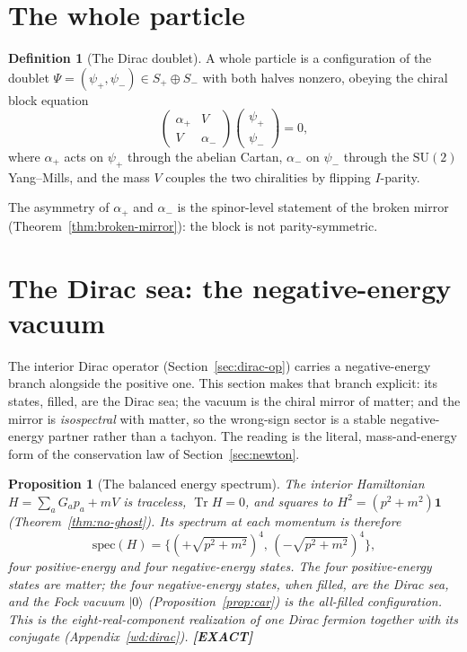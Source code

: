 \documentclass[11pt,oneside]{book}
\newcommand{\Tr}{\operatorname{Tr}}
\newcommand{\status}[1]{{\sffamily\bfseries\color{statuscol}[#1]}}
\theoremstyle{plain}
\newtheorem{proposition}[theorem]{Proposition}
\theoremstyle{definition}
\newtheorem{definition}[theorem]{Definition}
\theoremstyle{remark}
\begin{document}
\section{The whole particle}
\label{sec:whole-particle}

\begin{definition}[The Dirac doublet]
\label{def:whole}
A whole particle is a configuration of the doublet $\Psi=(\psi_+,\psi_-)\in
S_+\oplus S_-$ with both halves nonzero, obeying the chiral block equation
\[
  \begin{pmatrix}\alpha_+ & V\\ V & \alpha_-\end{pmatrix}
  \begin{pmatrix}\psi_+\\ \psi_-\end{pmatrix}=0,
\]
where $\alpha_+$ acts on $\psi_+$ through the abelian Cartan, $\alpha_-$ on $\psi_-$
through the $\mathrm{SU}(2)$ Yang--Mills, and the mass $V$ couples the two
chiralities by flipping $I$-parity.
\end{definition}

The asymmetry of $\alpha_+$ and $\alpha_-$ is the spinor-level statement of the
broken mirror (Theorem~\ref{thm:broken-mirror}): the block is not parity-symmetric.

\section{The Dirac sea: the negative-energy vacuum}
\label{sec:dirac-sea}

The interior Dirac operator (Section~\ref{sec:dirac-op}) carries a negative-energy
branch alongside the positive one. This section makes that branch explicit: its
states, filled, are the Dirac sea; the vacuum is the chiral mirror of matter; and the
mirror is \emph{isospectral} with matter, so the wrong-sign sector is a stable
negative-energy partner rather than a tachyon. The reading is the literal,
mass-and-energy form of the conservation law of Section~\ref{sec:newton}.

\begin{proposition}[The balanced energy spectrum]
\label{prop:sea-spectrum}
The interior Hamiltonian $H=\sum_a G_a p_a+mV$ is traceless, $\Tr H=0$, and squares to
$H^2=(p^2+m^2)\mathbf 1$ (Theorem~\ref{thm:no-ghost}). Its spectrum at each momentum is
therefore
\[
  \mathrm{spec}(H)=\bigl\{(+\sqrt{p^2+m^2})^{4},\,(-\sqrt{p^2+m^2})^{4}\bigr\},
\]
four positive-energy and four negative-energy states. The four positive-energy states
are matter; the four negative-energy states, when filled, are the Dirac sea, and the
Fock vacuum $|0\rangle$ (Proposition~\ref{prop:car}) is the all-filled configuration.
This is the eight-real-component realization of one Dirac fermion together with its
conjugate (Appendix~\ref{wd:dirac}). \status{EXACT}
\end{proposition}
\end{document}
